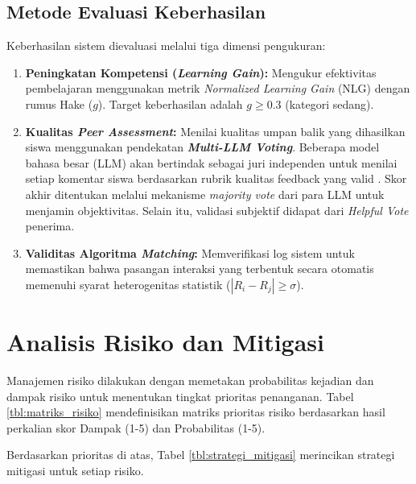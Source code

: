 \subsection{Metode Evaluasi Keberhasilan}
Keberhasilan sistem dievaluasi melalui tiga dimensi pengukuran:

\begin{enumerate}
    \item \textbf{Peningkatan Kompetensi (\textit{Learning Gain}):}
    Mengukur efektivitas pembelajaran menggunakan metrik \textit{Normalized Learning Gain} (NLG) dengan rumus Hake ($g$). Target keberhasilan adalah $g \geq 0.3$ (kategori sedang).
    
    \item \textbf{Kualitas \textit{Peer Assessment}:}
    Menilai kualitas umpan balik yang dihasilkan siswa menggunakan pendekatan \textbf{\textit{Multi-LLM Voting}}. Beberapa model bahasa besar (LLM) akan bertindak sebagai juri independen untuk menilai setiap komentar siswa berdasarkan rubrik kualitas feedback yang valid \autocite{Kerman2024}. Skor akhir ditentukan melalui mekanisme \textit{majority vote} dari para LLM untuk menjamin objektivitas. Selain itu, validasi subjektif didapat dari \textit{Helpful Vote} penerima.
    
    \item \textbf{Validitas Algoritma \textit{Matching}:}
    Memverifikasi log sistem untuk memastikan bahwa pasangan interaksi yang terbentuk secara otomatis memenuhi syarat heterogenitas statistik ($|R_i - R_j| \geq \sigma$).
\end{enumerate}

\section{Analisis Risiko dan Mitigasi}
\label{sec:risiko_mitigasi}
Manajemen risiko dilakukan dengan memetakan probabilitas kejadian dan dampak risiko untuk menentukan tingkat prioritas penanganan. Tabel \ref{tbl:matriks_risiko} mendefinisikan matriks prioritas risiko berdasarkan hasil perkalian skor Dampak (1-5) dan Probabilitas (1-5).



Berdasarkan prioritas di atas, Tabel \ref{tbl:strategi_mitigasi} merincikan strategi mitigasi untuk setiap risiko.

